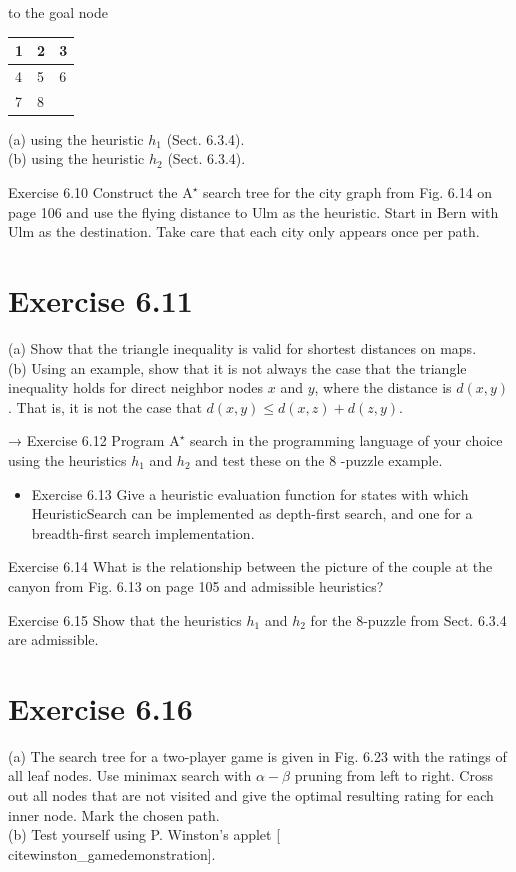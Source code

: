 \documentclass[10pt]{book}
\begin{document}
to the goal node

\begin{center}
\begin{tabular}{||l|l|l|}
\hline
1 & 2 & 3 \\
\hline
4 & 5 & 6 \\
\hline
7 & 8 &  \\
\hline
\end{tabular}
\end{center}

(a) using the heuristic $h_{1}$ (Sect. 6.3.4).\\
(b) using the heuristic $h_{2}$ (Sect. 6.3.4).

Exercise 6.10 Construct the $\mathrm{A}^{\star}$ search tree for the city graph from Fig. 6.14 on page 106 and use the flying distance to Ulm as the heuristic. Start in Bern with Ulm as the destination. Take care that each city only appears once per path.

\section*{Exercise 6.11}
(a) Show that the triangle inequality is valid for shortest distances on maps.\\
(b) Using an example, show that it is not always the case that the triangle inequality holds for direct neighbor nodes $x$ and $y$, where the distance is $d(x, y)$. That is, it is not the case that $d(x, y) \leq d(x, z)+d(z, y)$.

→ Exercise 6.12 Program $\mathrm{A}^{\star}$ search in the programming language of your choice using the heuristics $h_{1}$ and $h_{2}$ and test these on the 8 -puzzle example.

\begin{itemize}
  \item Exercise 6.13 Give a heuristic evaluation function for states with which HeuristicSearch can be implemented as depth-first search, and one for a breadth-first search implementation.
\end{itemize}

Exercise 6.14 What is the relationship between the picture of the couple at the canyon from Fig. 6.13 on page 105 and admissible heuristics?


Exercise 6.15 Show that the heuristics $h_{1}$ and $h_{2}$ for the 8-puzzle from Sect. 6.3.4 are admissible.

\section*{Exercise 6.16}
(a) The search tree for a two-player game is given in Fig. 6.23 with the ratings of all leaf nodes. Use minimax search with $\alpha-\beta$ pruning from left to right. Cross out all nodes that are not visited and give the optimal resulting rating for each inner node. Mark the chosen path.\\[0pt]
(b) Test yourself using P. Winston's applet [\\cite{winston_gamedemonstration}].
\end{document}

